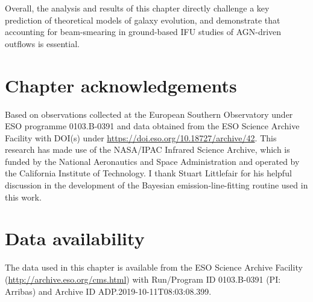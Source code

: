 Overall, the analysis and results of this chapter directly challenge a key prediction of theoretical models of galaxy evolution, and demonstrate that accounting for beam-smearing in ground-based IFU studies of AGN-driven outflows is essential.

\section*{Chapter acknowledgements}

Based on observations collected at the European Southern Observatory under ESO programme 0103.B-0391 and data obtained from the ESO Science Archive Facility with DOI(s) under \url{https://doi.eso.org/10.18727/archive/42}. This research has made use of the NASA/IPAC Infrared Science Archive, which is funded by the National Aeronautics and Space Administration and operated by the California Institute of Technology. I thank Stuart Littlefair for his helpful discussion in the development of the Bayesian emission-line-fitting routine used in this work.

\section*{Data availability}

The data used in this chapter is available from the ESO Science Archive Facility (\url{http://archive.eso.org/cms.html}) with Run/Program ID 0103.B-0391 (PI: Arribas) and Archive ID ADP.2019-10-11T08:03:08.399.
